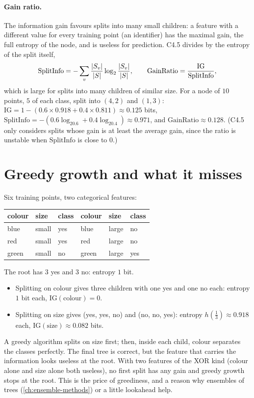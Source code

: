 \begin{notechapter}
\paragraph{Gain ratio.} The information gain favours splits into many small children: a
feature with a different value for every training point (an identifier) has the
maximal gain, the full entropy of the node, and is useless for prediction. C4.5 divides
by the entropy of the split itself,
\[
  \mathrm{SplitInfo} = -\sum_v\frac{\left|S_v\right|}{\left|S\right|}\log_2\frac{\left|S_v\right|}{\left|S\right|},\qquad
  \mathrm{GainRatio} = \frac{\mathrm{IG}}{\mathrm{SplitInfo}},
\]
which is large for splits into many children of similar size. For a node of $10$ points, $5$
of each class, split into $(4, 2)$ and $(1, 3)$: $\mathrm{IG} = 1 - (0.6\times0.918 + 0.4\times0.811)\approx0.125$ bits,
$\mathrm{SplitInfo} = -(0.6\log_20.6 + 0.4\log_20.4)\approx0.971$, and $\mathrm{GainRatio}\approx0.128$. (C4.5 only
considers splits whose gain is at least the average gain, since the ratio is unstable
when $\mathrm{SplitInfo}$ is close to $0$.)

\section{Greedy growth and what it misses}\label{decision-trees:sec:greedy}

\begin{example}\label{decision-trees:ex:xor}
Six training points, two categorical features:
\begin{center}
\begin{tabular}{@{}lll@{\qquad}lll@{}}
\toprule
colour & size & class & colour & size & class \\
\midrule
blue & small & yes & blue & large & no \\
red & small & yes & red & large & no \\
green & small & no & green & large & yes \\
\bottomrule
\end{tabular}
\end{center}
The root has $3$ yes and $3$ no: entropy $1$ bit.
\begin{itemize}[nosep]
  \item Splitting on colour gives three children with one yes and one no each: entropy $1$
        bit each, $\mathrm{IG}(\text{colour}) = 0$.
  \item Splitting on size gives (yes, yes, no) and (no, no, yes): entropy $h(\frac13)\approx0.918$ each,
        $\mathrm{IG}(\text{size})\approx0.082$ bits.
\end{itemize}
A greedy algorithm splits on size first; then, inside each child, colour separates the
classes perfectly. The final tree is correct, but the feature that carries the
information looks useless at the root. With two features of the XOR kind (colour
alone and size alone both useless), no first split has any gain and greedy growth stops
at the root. This is the price of greediness, and a reason why ensembles of trees
(\cref{ch:ensemble-methods}) or a little lookahead help.
\end{example}


\end{notechapter}
